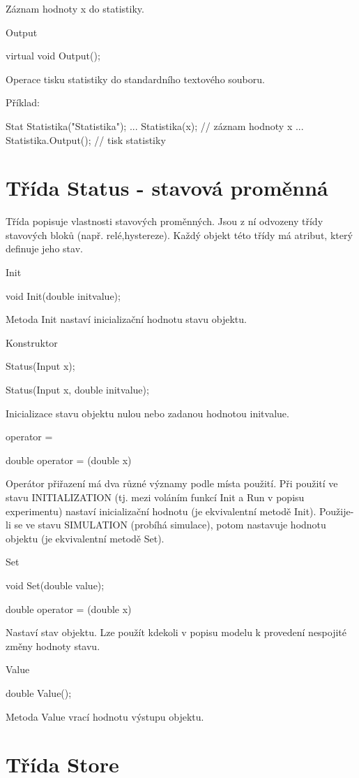 \documentclass[a4paper]{article}
\begin{document}
Záznam hodnoty x do statistiky.


Output

  virtual void Output();


Operace tisku statistiky do standardního textového souboru.

Příklad:

Stat Statistika("Statistika");
  ...
  Statistika(x);        // záznam hodnoty x
  ...
  Statistika.Output();  // tisk statistiky


\section{Třída Status - stavová proměnná}

Třída popisuje vlastnosti stavových proměnných. Jsou z ní odvozeny
třídy stavových bloků (např. relé,hystereze). Každý objekt této třídy
má atribut, který definuje jeho stav.


Init

  void Init(double initvalue);


Metoda Init nastaví inicializační hodnotu stavu objektu.


Konstruktor

  Status(Input x);

  Status(Input x, double initvalue);


Inicializace stavu objektu nulou nebo zadanou hodnotou initvalue.


operator =

  double operator = (double x)


Operátor přiřazení má dva různé významy podle místa použití. Při
použití ve stavu INITIALIZATION (tj. mezi voláním funkcí Init
a Run v popisu experimentu) nastaví inicializační hodnotu
(je ekvivalentní metodě Init). Použije-li se ve stavu SIMULATION
(probíhá simulace), potom nastavuje hodnotu objektu (je ekvivalentní
metodě Set).


Set

  void Set(double value);

  double operator = (double x)


Nastaví stav objektu. Lze použít kdekoli v popisu modelu k provedení
nespojité změny hodnoty stavu.


Value

  double Value();


Metoda Value vrací hodnotu výstupu objektu.

\section{Třída Store}
\end{document}
